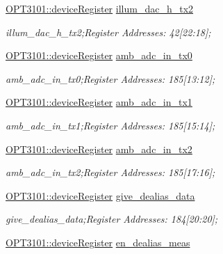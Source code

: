 \begin{DoxyCompactItemize}
\mbox{\hyperlink{class_o_p_t3101_1_1device_register}{O\+P\+T3101\+::device\+Register}} \mbox{\hyperlink{class_o_p_t3101_1_1registers_adfe041f139afb2bc8ae662b5e3f4a630}{illum\+\_\+dac\+\_\+h\+\_\+tx2}}
\begin{DoxyCompactList}\small\item\em illum\+\_\+dac\+\_\+h\+\_\+tx2;Register Addresses\+: 42\mbox{[}22\+:18\mbox{]}; \end{DoxyCompactList}\item 
\mbox{\hyperlink{class_o_p_t3101_1_1device_register}{O\+P\+T3101\+::device\+Register}} \mbox{\hyperlink{class_o_p_t3101_1_1registers_a264eda6822d89e022cddb6f1c2217028}{amb\+\_\+adc\+\_\+in\+\_\+tx0}}
\begin{DoxyCompactList}\small\item\em amb\+\_\+adc\+\_\+in\+\_\+tx0;Register Addresses\+: 185\mbox{[}13\+:12\mbox{]}; \end{DoxyCompactList}\item 
\mbox{\hyperlink{class_o_p_t3101_1_1device_register}{O\+P\+T3101\+::device\+Register}} \mbox{\hyperlink{class_o_p_t3101_1_1registers_a6f5ba848c54ce6b47d8364879358c31b}{amb\+\_\+adc\+\_\+in\+\_\+tx1}}
\begin{DoxyCompactList}\small\item\em amb\+\_\+adc\+\_\+in\+\_\+tx1;Register Addresses\+: 185\mbox{[}15\+:14\mbox{]}; \end{DoxyCompactList}\item 
\mbox{\hyperlink{class_o_p_t3101_1_1device_register}{O\+P\+T3101\+::device\+Register}} \mbox{\hyperlink{class_o_p_t3101_1_1registers_a585e9fc419172f85b90262871e40027b}{amb\+\_\+adc\+\_\+in\+\_\+tx2}}
\begin{DoxyCompactList}\small\item\em amb\+\_\+adc\+\_\+in\+\_\+tx2;Register Addresses\+: 185\mbox{[}17\+:16\mbox{]}; \end{DoxyCompactList}\item 
\mbox{\hyperlink{class_o_p_t3101_1_1device_register}{O\+P\+T3101\+::device\+Register}} \mbox{\hyperlink{class_o_p_t3101_1_1registers_a5c5d2db376e2b9808805ab04660503d1}{give\+\_\+dealias\+\_\+data}}
\begin{DoxyCompactList}\small\item\em give\+\_\+dealias\+\_\+data;Register Addresses\+: 184\mbox{[}20\+:20\mbox{]}; \end{DoxyCompactList}\item 
\mbox{\hyperlink{class_o_p_t3101_1_1device_register}{O\+P\+T3101\+::device\+Register}} \mbox{\hyperlink{class_o_p_t3101_1_1registers_a0ada6bc0729541f5740281e93a12cc22}{en\+\_\+dealias\+\_\+meas}}

\end{DoxyCompactItemize}
